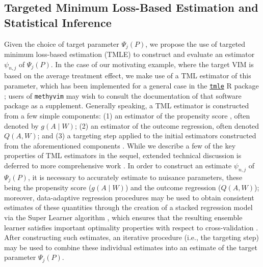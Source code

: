 \documentclass[9pt,a4paper,]{extarticle}
\theoremstyle{definition}
\theoremstyle{definition}
\theoremstyle{definition}
\theoremstyle{remark}
\begin{document}
\hypertarget{targeted-minimum-loss-based-estimation-and-statistical-inference}{%
\subsection{Targeted Minimum Loss-Based Estimation and Statistical Inference}\label{targeted-minimum-loss-based-estimation-and-statistical-inference}}

Given the choice of target parameter \(\Psi_j(P)\), we propose the use of targeted
minimum loss-based estimation (TMLE) to construct and evaluate an estimator
\(\psi_{n, j}\) of \(\Psi_j(P)\). In the case of our motivating example, where the
target VIM is based on the average treatment effect, we make use of a TML
estimator of this parameter, which has been implemented for a general case in
the \href{https://CRAN.R-project.org/package=tmle}{\texttt{tmle}} R package
\citep{gruber2011tmle}; users of \texttt{methyvim} may wish to consult the documentation of
that software package as a supplement. Generally speaking, a TML estimator is
constructed from a few simple components: (1) an estimator of the propensity
score \citep{rosenbaum1983central}, often denoted by \(g(A \mid W)\); (2) an estimator
of the outcome regression, often denoted \(Q(A, W)\); and (3) a targeting step
applied to the initial estimators constructed from the aforementioned components
\citep{gruber2009targeted}. While we describe a few of the key properties of TML
estimators in the sequel, extended technical discussion is deferred to more
comprehensive work \citep[\citet{vdl2018targeted}]{vdl2011targeted}. In order to construct
an estimate \(\psi_{n, j}\) of \(\Psi_j(P)\), it is necessary to accurately estimate
to nuisance parameters, these being the propensity score (\(g(A \mid W)\)) and the
outcome regression (\(Q(A, W)\)); moreover, data-adaptive regression procedures
may be used to obtain consistent estimates of these quantities through the
creation of a stacked regression model via the Super Learner algorithm
\citep[\citet{breiman1996stacked}, \citet{vdl2007super}]{wolpert1992stacked}, which ensures
that the resulting ensemble learner satisfies important optimality properties
with respect to cross-validation \citep[\citet{dudoit2005asymptotics},
\citet{vdl2003unified}]{vdl2004asymptotic}. After constructing such estimates, an iterative procedure
(i.e., the targeting step) may be used to combine these individual estimates
into an estimate of the target parameter \(\Psi_j(P)\).
\end{document}
